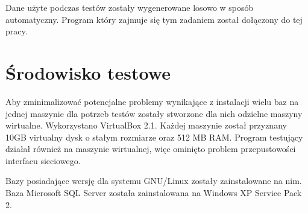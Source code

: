 Dane użyte podczas testów zostały wygenerowane losowo w sposób automatyczny. 
Program który zajmuje się tym zadaniem został dołączony do tej pracy.





\section{Środowisko testowe}

Aby zminimalizować potencjalne problemy wynikające z instalacji wielu baz na jednej maszynie dla potrzeb testów zostały stworzone dla nich odzielne maszyny wirtualne. Wykorzystano VirtualBox 2.1. Każdej maszynie został przyznany 10GB virtualny dysk o stałym rozmiarze oraz 512 MB RAM. Program testujący działał również na maszynie wirtualnej, więc ominięto problem przepustowości interfacu sieciowego. 

Bazy posiadające wersję dla systemu GNU/Linux zostały zainstalowane na nim. Baza Microsoft SQL Server została zainstalowana na Windows XP Service Pack 2.
